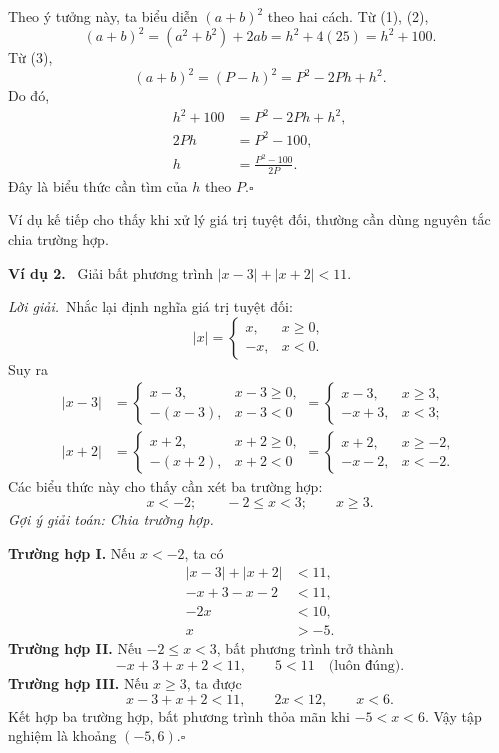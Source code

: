 \documentclass[12pt,a4paper]{article}
\newcommand{\ex}[1]{\par\medskip\noindent\textbf{Ví dụ #1.}\ }
\newcommand{\sol}{\par\noindent\textit{Lời giải.}\ }
\begin{document}
Theo ý tưởng này, ta biểu diễn $(a+b)^2$ theo hai cách. Từ (1), (2),
\[(a+b)^2=(a^2+b^2)+2ab=h^2+4(25)=h^2+100.\]
Từ (3),
\[(a+b)^2=(P-h)^2=P^2-2Ph+h^2.\]
Do đó,
\begin{align*}
h^2+100&=P^2-2Ph+h^2,\\
2Ph&=P^2-100,\\
h&=\frac{P^2-100}{2P}.
\end{align*}
Đây là biểu thức cần tìm của $h$ theo $P$.\hfill$\square$

Ví dụ kế tiếp cho thấy khi xử lý giá trị tuyệt đối, thường cần dùng nguyên tắc chia trường hợp.
\ex{2} Giải bất phương trình $|x-3|+|x+2|<11$.
\sol Nhắc lại định nghĩa giá trị tuyệt đối:
\[|x|=\begin{cases}x,&x\ge0,\\-x,&x<0.\end{cases}\]
Suy ra
\begin{align*}
|x-3|&=\begin{cases}x-3,&x-3\ge0,\\-(x-3),&x-3<0\end{cases}
=\begin{cases}x-3,&x\ge3,\\-x+3,&x<3;\end{cases}\\
|x+2|&=\begin{cases}x+2,&x+2\ge0,\\-(x+2),&x+2<0\end{cases}
=\begin{cases}x+2,&x\ge-2,\\-x-2,&x<-2.\end{cases}
\end{align*}
Các biểu thức này cho thấy cần xét ba trường hợp:
\[x<-2;\qquad -2\le x<3;\qquad x\ge3.\]
\noindent\textit{Gợi ý giải toán: Chia trường hợp.}

\noindent\textbf{Trường hợp I.} Nếu $x<-2$, ta có
\begin{align*}
|x-3|+|x+2|&<11,\\
-x+3-x-2&<11,\\
-2x&<10,\\
x&>-5.
\end{align*}
\noindent\textbf{Trường hợp II.} Nếu $-2\le x<3$, bất phương trình trở thành
\[-x+3+x+2<11,\qquad 5<11\quad\text{(luôn đúng)}.\]
\noindent\textbf{Trường hợp III.} Nếu $x\ge3$, ta được
\[x-3+x+2<11,\qquad 2x<12,\qquad x<6.\]
Kết hợp ba trường hợp, bất phương trình thỏa mãn khi $-5<x<6$. Vậy tập nghiệm là khoảng $(-5,6)$.\hfill$\square$
\end{document}
